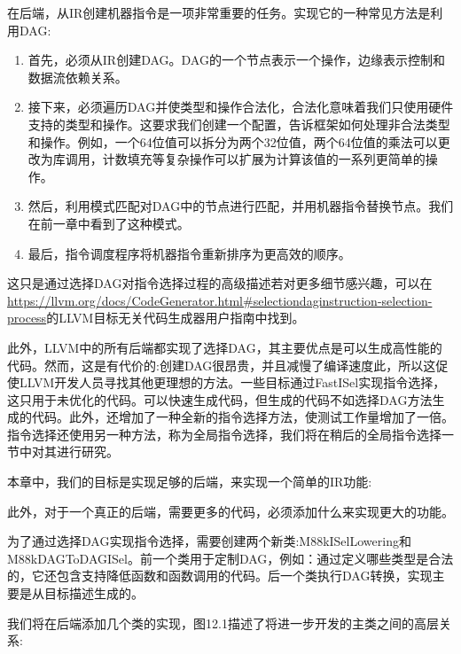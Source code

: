 

在后端，从IR创建机器指令是一项非常重要的任务。实现它的一种常见方法是利用DAG:

\begin{enumerate}
\item
首先，必须从IR创建DAG。DAG的一个节点表示一个操作，边缘表示控制和数据流依赖关系。

\item
接下来，必须遍历DAG并使类型和操作合法化，合法化意味着我们只使用硬件支持的类型和操作。这要求我们创建一个配置，告诉框架如何处理非合法类型和操作。例如，一个64位值可以拆分为两个32位值，两个64位值的乘法可以更改为库调用，计数填充等复杂操作可以扩展为计算该值的一系列更简单的操作。

\item
然后，利用模式匹配对DAG中的节点进行匹配，并用机器指令替换节点。我们在前一章中看到了这种模式。

\item
最后，指令调度程序将机器指令重新排序为更高效的顺序。
\end{enumerate}

这只是通过选择DAG对指令选择过程的高级描述若对更多细节感兴趣，可以在\url{https://llvm.org/docs/CodeGenerator.html#selectiondaginstruction-selection-process}的LLVM目标无关代码生成器用户指南中找到。

此外，LLVM中的所有后端都实现了选择DAG，其主要优点是可以生成高性能的代码。然而，这是有代价的:创建DAG很昂贵，并且减慢了编译速度此，所以这促使LLVM开发人员寻找其他更理想的方法。一些目标通过FastISel实现指令选择，这只用于未优化的代码。可以快速生成代码，但生成的代码不如选择DAG方法生成的代码。此外，还增加了一种全新的指令选择方法，使测试工作量增加了一倍。指令选择还使用另一种方法，称为全局指令选择，我们将在稍后的全局指令选择一节中对其进行研究。

本章中，我们的目标是实现足够的后端，来实现一个简单的IR功能:


此外，对于一个真正的后端，需要更多的代码，必须添加什么来实现更大的功能。

为了通过选择DAG实现指令选择，需要创建两个新类:M88kISelLowering和M88kDAGToDAGISel。前一个类用于定制DAG，例如：通过定义哪些类型是合法的，它还包含支持降低函数和函数调用的代码。后一个类执行DAG转换，实现主要是从目标描述生成的。

我们将在后端添加几个类的实现，图12.1描述了将进一步开发的主类之间的高层关系:

